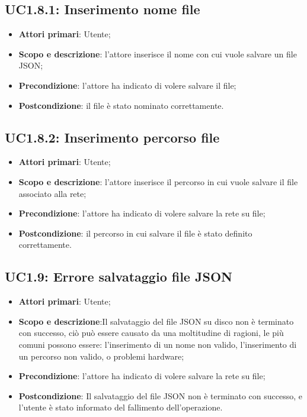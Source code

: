 \subsection{UC1.8.1: Inserimento nome file} 
\hypertarget{UC1.8.1}{} 
\begin{itemize} 
	\item{\textbf{Attori primari}: Utente;} 
	\item{\textbf{Scopo e descrizione}: l'attore inserisce il nome con cui vuole salvare un file JSON;} 
	\item{\textbf{Precondizione}: l'attore ha indicato di volere salvare il file;} 
	\item{\textbf{Postcondizione}: il file è stato nominato correttamente.} 
\end{itemize} 
\subsection{UC1.8.2: Inserimento percorso file} 
\hypertarget{UC1.8.2}{} 
\begin{itemize} 
	\item{\textbf{Attori primari}: Utente;} 
	\item{\textbf{Scopo e descrizione}: l'attore inserisce il percorso in cui vuole salvare il file associato alla rete;} 
	\item{\textbf{Precondizione}: l'attore ha indicato di volere salvare la rete su file;} 
	\item{\textbf{Postcondizione}: il percorso in cui salvare il file è stato definito correttamente.}
\end{itemize} 
\subsection{UC1.9: Errore salvataggio file JSON} 
\hypertarget{UC1.9}{} 
\begin{itemize} 
	\item{\textbf{Attori primari}: Utente;} 
	\item{\textbf{Scopo e descrizione}:Il salvataggio del file JSON su disco non è terminato con successo, ciò può essere causato da una moltitudine di ragioni, le più comuni possono essere: l'inserimento di un nome non valido, l'inserimento di un percorso non valido, o problemi hardware;} 
	\item{\textbf{Precondizione}: l'attore ha indicato di volere salvare la rete su file;} 
	\item{\textbf{Postcondizione}: Il salvataggio del file JSON non è terminato con successo, e l'utente è stato informato del fallimento dell'operazione.} 
\end{itemize}
